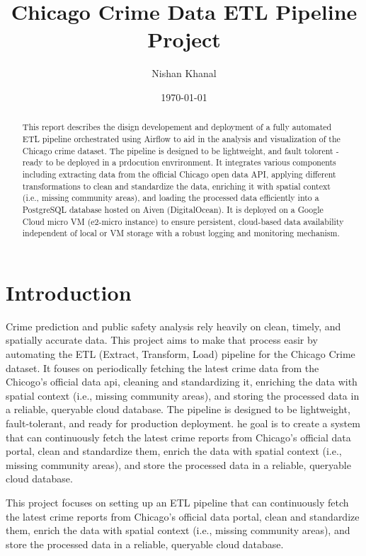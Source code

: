 \documentclass[12pt]{article}
\title{Chicago Crime Data ETL Pipeline Project}
\author{Nishan Khanal}
\date{\today}
\begin{document}
\maketitle

\tableofcontents

\newpage
\begin{abstract}
    This report describes the disign developement and deployment of a fully automated ETL pipeline orchestrated using Airflow to aid in the analysis and visualization of the Chicago crime dataset. The pipeline is designed to be lightweight, and fault tolorent - ready to be deployed in a prdocution envrironment. It integrates various components including extracting data from the official Chicago open data API, applying different transformations to clean and standardize the data, enriching it with spatial context (i.e., missing community areas), and loading the processed data efficiently into a PostgreSQL database hosted on Aiven (DigitalOcean). It is deployed on a Google Cloud micro VM (e2-micro instance) to ensure persistent, cloud-based data availability independent of local or VM storage with a robust logging and monitoring mechanism.
    \end{abstract}
    

\section{Introduction}

Crime prediction and public safety analysis rely heavily on clean, timely, and spatially accurate data. This project aims to make that process easir by automating the ETL (Extract, Transform, Load) pipeline for the Chicago Crime dataset. It fouses on periodically fetching the latest crime data from the Chicogo's official data api, cleaning and standardizing it, enriching the data with spatial context (i.e., missing community areas), and storing the processed data in a reliable, queryable cloud database. The pipeline is designed to be lightweight, fault-tolerant, and ready for production deployment.
he goal is to create a system that can continuously fetch the latest crime reports from Chicago's official data portal, clean and standardize them, enrich the data with spatial context (i.e., missing community areas), and store the processed data in a reliable, queryable cloud database.

This project focuses on setting up an ETL pipeline that can continuously fetch the latest crime reports from Chicago's official data portal, clean and standardize them, enrich the data with spatial context (i.e., missing community areas), and store the processed data in a reliable, queryable cloud database.
\end{document}
